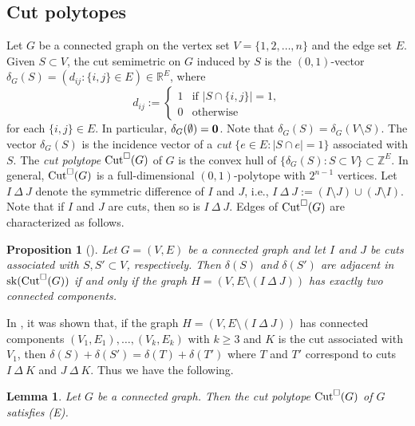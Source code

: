 \documentclass[12pt]{amsart}
\newtheorem{prop}[thm]{Proposition}
\newtheorem{lemma}[thm]{Lemma}
\theoremstyle{definition}
\numberwithin{thm}{section}
\numberwithin{equation}{section}
\def\NZQ{\mathbb}               %
\def\ZZ{{\NZQ Z}}
\def\RR{{\NZQ R}}
\begin{document}
\subsection{Cut polytopes}
Let $G$ be a connected graph on the vertex set $V=\{1,2,\dots,n\}$
and the edge set $E$. 
Given $S\subset V$, the cut semimetric on $G$ induced by $S$ is the $(0,1)$-vector $\delta_G(S)=(d_{ij} : \{i,j\}\in E) \in \RR^{E}$, where
$$
d_{ij}
:=
\left\{
\begin{array}{cl}
1     & \mbox{if } |S\cap \{i,j\}|=1, \\
0     & \mbox{otherwise } 
\end{array}
\right.
$$
for each $\{i,j\}\in E$.
In particular, $\delta_G(\emptyset) = {\bf 0}$.
Note that $\delta_G(S) = \delta_G(V \setminus S)$.
The vector $\delta_G(S)$ is the incidence vector
of a {\it cut} $\{e \in E : |S\cap e|=1 \}$ associated with $S$.
The \textit{cut polytope} ${\rm Cut}^\Box(G)$ of $G$ is the convex hull of $\{\delta_G(S) : S \subset V\} \subset  \ZZ^E$.
In general, ${\rm Cut}^\Box(G)$ is a full-dimensional $(0,1)$-polytope with $2^{n-1}$ vertices.
Let $I\ \Delta \ J$ denote the symmetric difference of $I$ and $J$, i.e., 
$I\ \Delta\ J := (I \setminus J ) \cup  (J\setminus I)$.
Note that if $I$ and $J$ are cuts, then so is $I \ \Delta \ J$.
Edges of ${\rm Cut}^\Box(G)$ are characterized as follows.

\begin{prop}[{\cite[Theorem 4.1]{BM}}]
\label{mmprop}
    Let $G=(V,E)$ be a connected graph and let 
    $I$ and $J$ be cuts associated with $S, S' \subset V$, respectively.
    Then $\delta(S)$ and $\delta(S')$ are adjacent in ${\rm sk}({\rm Cut}^\Box(G))$
    if and only if 
   the graph $H=(V, E \setminus (I \ \Delta \ J))$
has exactly two connected components.
\end{prop}

In \cite[Proof of Theorem 4.1]{BM},
it was shown that,
if the graph $H=(V, E \setminus (I \ \Delta \ J))$ has connected components 
$(V_1,E_1), \dots, (V_k,E_k)$ with $k \ge 3$
and $K$ is the cut associated with $V_1$,
then 
$\delta(S) + \delta(S') = \delta(T) + \delta(T') $
where $T$ and $T'$ correspond to cuts
$I \ \Delta \ K$ and $J \ \Delta \ K$.
Thus we have the following.

\begin{lemma}
    Let $G$ be a connected graph. Then the cut polytope ${\rm Cut}^\Box(G)$ of $G$ satisfies (E).
\end{lemma}
\end{document}
